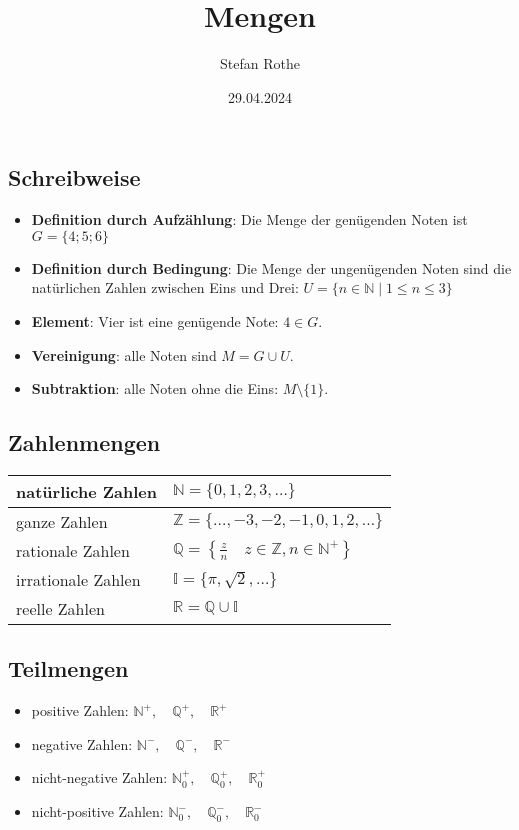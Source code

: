 \documentclass[parskip=half]{scrartcl}
\title{Mengen}
\author{Stefan Rothe}
\date{29.04.2024}
\begin{document}
  \maketitle

  \subsection*{Schreibweise}
  \begin{itemize}
    \item \textbf{Definition durch Aufzählung}: Die Menge der genügenden Noten ist $G = \{ 4; 5; 6 \}$
    \item \textbf{Definition durch Bedingung}: Die Menge der ungenügenden Noten sind die natürlichen Zahlen zwischen Eins und Drei: $U = \{ n\in \mathbb{N} \mid 1 \le n \le 3 \}$
    \item \textbf{Element}: Vier ist eine genügende Note: $4\in G$.
    \item \textbf{Vereinigung}: alle Noten sind $M = G\cup U$.
    \item \textbf{Subtraktion}: alle Noten ohne die Eins: $M \setminus \{1\}$.

  \end{itemize}

  \subsection*{Zahlenmengen}
  \begin{center}
    \begin{tabularx}{0.9\textwidth}{lX}
    \toprule
      natürliche Zahlen & $\mathbb{N} = \{ 0, 1, 2, 3, \ldots \}$ \\
    \midrule
      ganze Zahlen & $\mathbb{Z} = \{\ldots, -3, -2, -1, 0, 1, 2, \ldots \}$ \\
    \midrule
      rationale Zahlen & $\mathbb{Q} = \left\{\frac{z}{n}\quad z\in\mathbb{Z}, n\in \mathbb{N}^{+}\right\}$ \\
    \midrule
      irrationale Zahlen & $\mathbb{I} = \{ \pi, \sqrt{2}, \ldots \}$ \\
    \midrule
      reelle Zahlen & $\mathbb{R} = \mathbb{Q}\cup \mathbb{I}$ \\
    \bottomrule
    \end{tabularx}
  \end{center}

  \subsection*{Teilmengen}
  \begin{itemize}
    \item positive Zahlen: $\mathbb{N}^{+}, \quad \mathbb{Q}^{+},  \quad \mathbb{R}^{+}$
    \item negative Zahlen: $\mathbb{N}^{-}, \quad \mathbb{Q}^{-},  \quad \mathbb{R}^{-}$
    \item nicht-negative Zahlen: $\mathbb{N}_{0}^{+}, \quad \mathbb{Q}_{0}^{+}, \quad \mathbb{R}_{0}^{+}$
    \item nicht-positive Zahlen: $\mathbb{N}_{0}^{-}, \quad \mathbb{Q}_{0}^{-}, \quad \mathbb{R}_{0}^{-}$
  \end{itemize}
\end{document}
